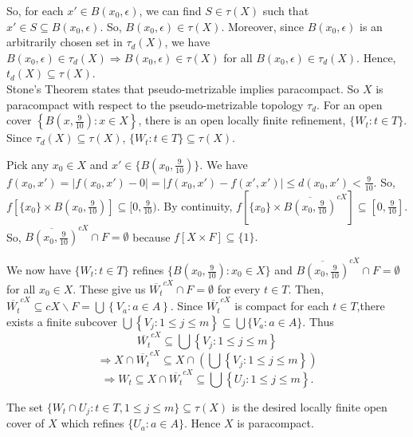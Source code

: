 \documentclass{amsart}
\begin{document}
\vskip 10pt


So, for each $x' \in B(x_0,\epsilon)$, we can find $S\in \tau(X)$ such that $x'\in S \subseteq B(x_0,\epsilon).$ So, $B(x_0,\epsilon) \in \tau(X)$.
Moreover, since $B(x_0, \epsilon)$ is an arbitrarily chosen set in 
$\tau_d(X)$, we have $B(x_0, \epsilon)\in \tau_d(X) \Rightarrow B(x_0,\epsilon) \in \tau(X)$ for all $B(x_0,\epsilon) \in \tau_d(X). $ Hence, $t_d(X) \subseteq \tau(X)$.\\


Stone's Theorem states that pseudo-metrizable implies paracompact. So $X$ is paracompact with respect to the pseudo-metrizable topology $\tau_d$. For an open cover $\left\{B(x,\frac{9}{10}): x\in X\right\}$, there is an open locally finite refinement, $\{W_t : t\in T\}.$ Since $\tau_d(X) \subseteq \tau(X)$, $\{W_t: t\in T\} \subseteq \tau(X)$. 


\vskip 10pt
Pick any $x_0\in X$ and $x' \in \{B(x_0,\frac{9}{10})\}$. We have $f(x_0, x')= |f(x_0,x')-0|=|f(x_0,x')-f(x',x')| \leq d(x_0,x') < \frac{9}{10}$. 
So, $f\left[\{x_0\} \times B(x_0, \frac{9}{10})\right] \subseteq [0,\frac{9}{10})$. By continuity, $f\left[\{x_0\}\times \overline{B(x_0,\frac{9}{10})}^{cX}\right] \subseteq [0,\frac{9}{10}].$ So, $\overline{B(x_0,\frac{9}{10})}^{cX} \cap F =\emptyset$ because $f\left[X\times F\right] \subseteq \{1\}.$

\vskip 15pt

We now have $\{W_t:  t\in T\}$ refines $\{B(x_0,\frac{9}{10}): x_0\in X\}$ and $\overline{B(x_0,\frac{9}{10})}^{cX} \cap F =\emptyset$ for all $x_0\in X$. These give us $\overline{W_t}^{cX} \cap F = \emptyset$ for every $t \in T$. Then, 
$\overline{W_t}^{cX} \subseteq cX\backslash F = \bigcup \left\{V_a: a\in A\right\}$. Since $\overline{W_t}^{cX}$ is compact for each $t \in T$,there exists a finite subcover $\bigcup \left\{V_j: 1\leq j\leq m\right\} \subseteq \bigcup \{V_a: a \in A\}$. Thus 
$$\overline{W_t}^{cX} \subseteq \bigcup \left\{V_j: 1\leq j \leq m \right\}$$ 
$$\Rightarrow X\cap \overline{W_t}^{cX} \subseteq X\cap (\bigcup \left\{V_j: 1\leq j \leq m\right\})$$
$$\Rightarrow W_t \subseteq X\cap \overline{W_t}^{cX} \subseteq \bigcup \left\{U_j: 1\leq j\leq m\right\}.$$

\vskip 15pt

The set $\{W_t \cap U_j: t\in T, 1 \leq j \leq m \} \subseteq \tau(X)$ is the desired locally finite open cover of $X$ which refines $\{U_a: a \in A\}$. Hence $X$ is paracompact.
\end{document}

